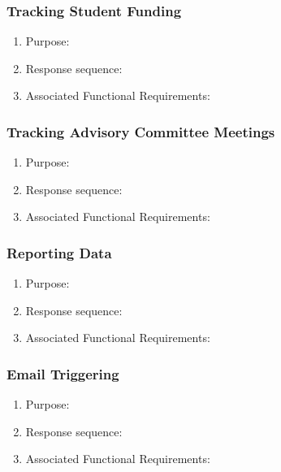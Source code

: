 \documentclass{journal}
\begin{document}
\subsubsection{Tracking Student Funding}
\begin{enumerate}
\item Purpose:
\item Response sequence:
\item Associated Functional Requirements:
\end{enumerate}


\subsubsection{Tracking Advisory Committee Meetings}
\begin{enumerate}
\item Purpose:
\item Response sequence:
\item Associated Functional Requirements:
\end{enumerate}


\subsubsection{Reporting Data}
\begin{enumerate}
\item Purpose:
\item Response sequence:
\item Associated Functional Requirements:
\end{enumerate}
\subsubsection{Email Triggering}
\begin{enumerate}
\item Purpose:
\item Response sequence:
\item Associated Functional Requirements:
\end{enumerate}
\end{document}
